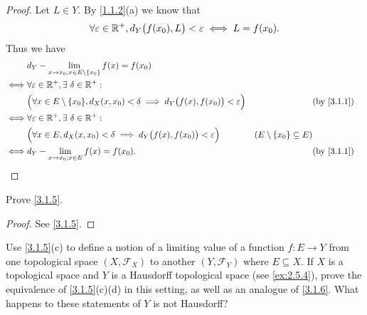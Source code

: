 \begin{proof}
  Let \(L \in Y\).
  By \cref{1.1.2}(a) we know that
  \[
    \forall \varepsilon \in \mathbb{R}^+, d_Y\big(f(x_0), L\big) < \varepsilon \iff L = f(x_0).
  \]
  Thus we have
  \begin{align*}
         & d_Y - \lim_{x \to x_0 ; x \in E \setminus \{x_0\}} f(x) = f(x_0)                                                                                                                  \\
    \iff & \forall \varepsilon \in \R^+, \exists\ \delta \in \R^+ :                                                                                                                          \\
         & \Big(\forall x \in E \setminus \{x_0\}, d_X(x, x_0) < \delta \implies d_Y\big(f(x), f(x_0)\big) < \varepsilon\Big) &                                   & \text{(by \cref{3.1.1})} \\
    \iff & \forall \varepsilon \in \R^+, \exists\ \delta \in \R^+ :                                                                                                                          \\
         & \Big(\forall x \in E, d_X(x, x_0) < \delta \implies d_Y\big(f(x), f(x_0)\big) < \varepsilon\Big)                   & (E \setminus \{x_0\} \subseteq E)                            \\
    \iff & d_Y - \lim_{x \to x_0 ; x \in E} f(x) = f(x_0).                                                                    &                                   & \text{(by \cref{3.1.1})}
  \end{align*}
\end{proof}

\begin{ex}\label{ex:3.1.2}
  Prove \cref{3.1.5}.
\end{ex}

\begin{proof}
  See \cref{3.1.5}.
\end{proof}

\begin{ex}\label{ex:3.1.3}
  Use \cref{3.1.5}(c) to define a notion of a limiting value of a function \(f : E \to Y\) from one topological space \((X, \mathcal{F}_X)\) to another \((Y, \mathcal{F}_Y)\) where \(E \subseteq X\).
  If \(X\) is a topological space and \(Y\) is a Hausdorff topological space (see \cref{ex:2.5.4}), prove the equivalence of \cref{3.1.5}(c)(d) in this setting, as well as an analogue of \cref{3.1.6}.
  What happens to these statements of \(Y\) is not Hausdorff?
\end{ex}

